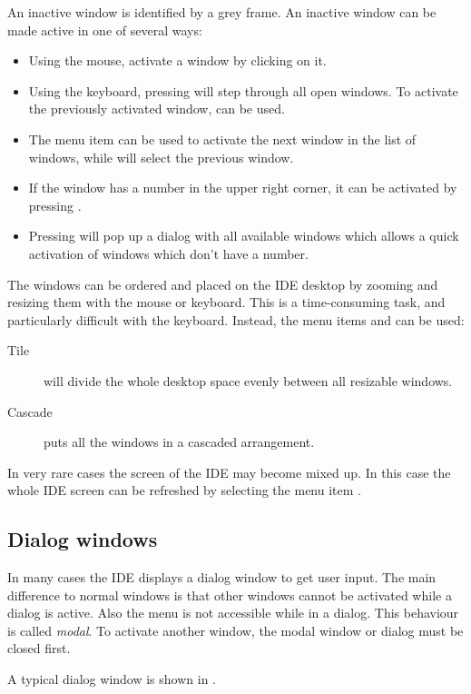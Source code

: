 An inactive window is identified by a grey frame. An inactive window can
be made active in one of several ways:
\begin{itemize}
\item Using the mouse, activate a window by clicking on it.
\item Using the keyboard, pressing  will step through all open
windows. To activate the previously activated window,  can
be used.
\item The menu item  can be used to activate the next
window in the list of windows, while  will select
the previous window.
\item If the window has a number in the upper right corner, it can be
activated by pressing .
\item Pressing  will pop up a dialog with all
available windows which allows a quick activation of windows which
don't have a number.
\end{itemize}

The windows can be ordered and placed on the IDE desktop by zooming and
resizing them with the mouse or keyboard. This is a time-consuming task,
and particularly difficult with the keyboard. Instead, the menu items
 and  can be used:
\begin{description}
\item[Tile] will divide the whole desktop space evenly between all resizable
windows.
\item[Cascade] puts all the windows in a cascaded arrangement.
\end{description}

In very rare cases the screen of the IDE may become mixed up. In this
case the whole IDE screen can be refreshed by selecting the menu item
.
%
%
\subsection{Dialog windows}
\label{se:dialogwindow}
In many cases the IDE displays a dialog window to get user input.
The main difference to normal windows is that other windows cannot be
activated while a dialog is active. Also the menu is not accessible while in
a dialog. This behaviour is called \emph{modal}. To activate another window,
the modal window or dialog must be closed first.

A typical dialog window is shown in .


